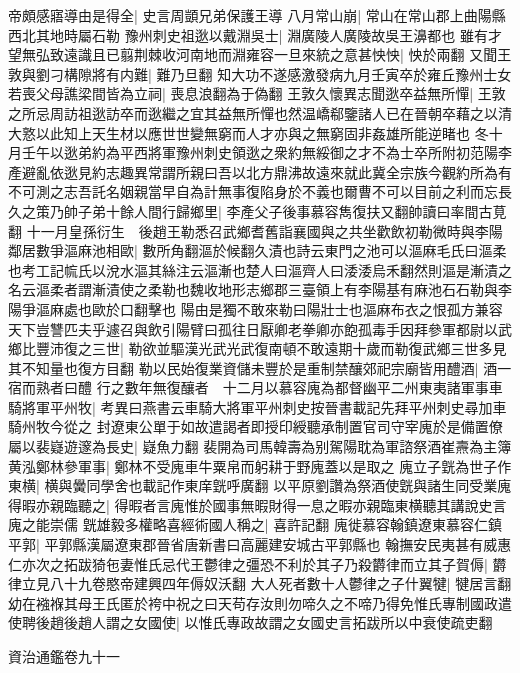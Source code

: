 帝頗感寤導由是得全|{
	史言周顗兄弟保護王導}
八月常山崩|{
	常山在常山郡上曲陽縣西北其地時屬石勒}
豫州刺史祖逖以戴淵吳士|{
	淵廣陵人廣陵故吳王濞都也}
雖有才望無弘致遠識且已翦荆棘收河南地而淵雍容一旦來統之意甚怏怏|{
	怏於兩翻}
又聞王敦與劉刁構隙將有内難|{
	難乃旦翻}
知大功不遂感激發病九月壬寅卒於雍丘豫州士女若喪父母譙梁間皆為立祠|{
	喪息浪翻為于偽翻}
王敦久懷異志聞逖卒益無所憚|{
	王敦之所忌周訪祖逖訪卒而逖繼之宜其益無所憚也然温嶠郗鑒諸人已在晉朝卒藉之以清大憝以此知上天生材以應世世變無窮而人才亦與之無窮固非姦雄所能逆睹也}
冬十月壬午以逖弟約為平西將軍豫州刺史領逖之衆約無綏御之才不為士卒所附初范陽李產避亂依逖見約志趣異常謂所親曰吾以北方鼎沸故遠來就此冀全宗族今觀約所為有不可測之志吾託名姻親當早自為計無事復陷身於不義也爾曹不可以目前之利而忘長久之策乃帥子弟十餘人間行歸鄉里|{
	李產父子後事慕容雋復扶又翻帥讀曰率間古莧翻}
十一月皇孫衍生　後趙王勒悉召武鄉耆舊詣襄國與之共坐歡飲初勒微時與李陽鄰居數爭漚麻池相歐|{
	數所角翻漚於候翻久漬也詩云東門之池可以漚麻毛氏曰漚柔也考工記㡆氏以涗水漚其絲注云漚漸也楚人曰漚齊人曰涹涹烏禾翻然則漚是漸漬之名云漚柔者謂漸漬使之柔勒也魏收地形志鄉郡三臺領上有李陽基有麻池石石勒與李陽爭漚麻處也歐於口翻擊也}
陽由是獨不敢來勒曰陽壯士也漚麻布衣之恨孤方兼容天下豈讐匹夫乎遽召與飲引陽臂曰孤往日厭卿老拳卿亦飽孤毒手因拜參軍都尉以武鄉比豐沛復之三世|{
	勒欲並驅漢光武光武復南頓不敢遠期十歲而勒復武鄉三世多見其不知量也復方目翻}
勒以民始復業資儲未豐於是重制禁釀郊祀宗廟皆用醴酒|{
	酒一宿而熟者曰醴}
行之數年無復釀者　十二月以慕容廆為都督幽平二州東夷諸軍事車騎將軍平州牧|{
	考異曰燕書云車騎大將軍平州刺史按晉書載記先拜平州刺史尋加車騎州牧今從之}
封遼東公單于如故遣謁者即授印綬聽承制置官司守宰廆於是備置僚屬以裴嶷遊邃為長史|{
	嶷魚力翻}
裴開為司馬韓壽為别駕陽耽為軍諮祭酒崔燾為主簿黄泓鄭林參軍事|{
	鄭林不受廆車牛粟帛而躬耕于野廆蓋以是取之}
廆立子皝為世子作東横|{
	横與黌同學舍也載記作東庠皝呼廣翻}
以平原劉讚為祭酒使皝與諸生同受業廆得暇亦親臨聽之|{
	得暇者言廆惟於國事無暇財得一息之暇亦親臨東横聽其講說史言廆之能崇儒}
皝雄毅多權略喜經術國人稱之|{
	喜許記翻}
廆徙慕容翰鎮遼東慕容仁鎮平郭|{
	平郭縣漢屬遼東郡晉省唐新書曰高麗建安城古平郭縣也}
翰撫安民夷甚有威惠仁亦次之拓跋猗㐌妻惟氏忌代王鬱律之彊恐不利於其子乃殺欝律而立其子賀傉|{
	欝律立見八十九卷愍帝建興四年傉奴沃翻}
大人死者數十人鬱律之子什翼犍|{
	犍居言翻}
幼在襁褓其母王氏匿於袴中祝之曰天苟存汝則勿啼久之不啼乃得免惟氏專制國政遣使聘後趙後趙人謂之女國使|{
	以惟氏專政故謂之女國史言拓跋所以中衰使疏吏翻}


資治通鑑卷九十一
